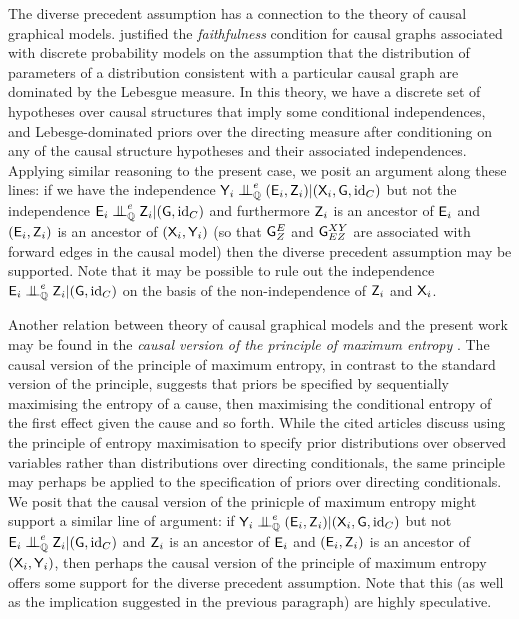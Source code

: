 The diverse precedent assumption has a connection to the theory of causal graphical models. \citet{meek_strong_1995} justified the \emph{faithfulness} condition for causal graphs associated with discrete probability models on the assumption that the distribution of parameters of a distribution consistent with a particular causal graph are dominated by the Lebesgue measure. In this theory, we have a discrete set of hypotheses over causal structures that imply some conditional independences, and Lebesge-dominated priors over the directing measure after conditioning on any of the causal structure hypotheses and their associated independences. Applying similar reasoning to the present case, we posit an argument along these lines: if we have the independence $\RV{Y}_i\CI^e_{\prob{Q}}(\RV{E}_i,\RV{Z}_i)|(\RV{X}_i,\RV{G},\mathrm{id}_C)$ but not the independence $\RV{E}_i\CI^e_{\prob{Q}} \RV{Z}_i|(\RV{G},\mathrm{id}_C)$ and furthermore $\mathsf{Z}_i$ is an ancestor of $\mathsf{E}_i$ and $(\mathsf{E}_i,\mathsf{Z}_i)$ is an ancestor of $(\mathsf{X}_i,\mathsf{Y}_i)$ (so that $\mathsf{G}^E_Z$ and $\mathsf{G}^{XY}_{EZ}$ are associated with forward edges in the causal model) then the diverse precedent assumption may be supported. Note that it may be possible to rule out the independence $\RV{E}_i\CI^e_{\prob{Q}} \RV{Z}_i|(\RV{G},\mathrm{id}_C)$ on the basis of the non-independence of $\mathsf{Z}_i$ and $\mathsf{X}_i$.

Another relation between theory of causal graphical models and the present work may be found in the \emph{causal version of the principle of maximum entropy} \citep{sunCausalInferenceChoosing2006,janzingCausalVersionsMaximum2021}. The causal version of the principle of maximum entropy, in contrast to the standard version of the principle, suggests that priors be specified by sequentially maximising the entropy of a cause, then maximising the conditional entropy of the first effect given the cause and so forth. While the cited articles discuss using the principle of entropy maximisation to specify prior distributions over observed variables rather than distributions over directing conditionals, the same principle may perhaps be applied to the specification of priors over directing conditionals. We posit that the causal version of the prinicple of maximum entropy might support a similar line of argument: if $\RV{Y}_i\CI^e_{\prob{Q}}(\RV{E}_i,\RV{Z}_i)|(\RV{X}_i,\RV{G},\mathrm{id}_C)$ but not $\RV{E}_i\CI^e_{\prob{Q}} \RV{Z}_i|(\RV{G},\mathrm{id}_C)$ and $\mathsf{Z}_i$ is an ancestor of $\mathsf{E}_i$ and $(\mathsf{E}_i,\mathsf{Z}_i)$ is an ancestor of $(\mathsf{X}_i,\mathsf{Y}_i)$, then perhaps the causal version of the principle of maximum entropy offers some support for the diverse precedent assumption. Note that this (as well as the implication suggested in the previous paragraph) are highly speculative.

